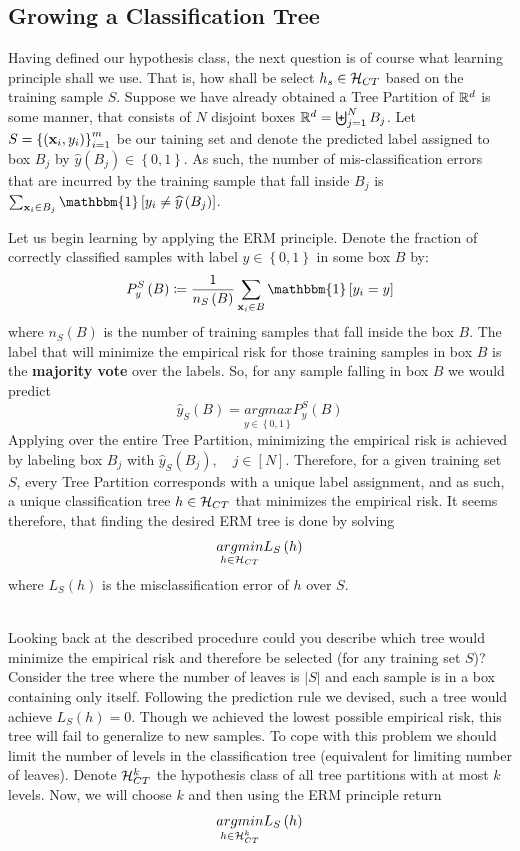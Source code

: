 \subsection{Growing a Classification Tree}
Having defined our hypothesis class, the next question is of course what learning principle shall we use. That is, how shall be select $h_s\in\mathcal{H}_{CT}$ based on the training sample $S$. Suppose we have already obtained a Tree Partition of $\mathbb{R}^d$ is some manner, that consists of $N$ disjoint boxes $\mathbb{R}^d=\biguplus_{j=1}^{N}B_j$. Let $S=\left\{\left(\mathbf{x}_i,y_i\right)\right\}^m_{i=1}$ be our taining set and denote the predicted label assigned to box $B_j$ by $\widehat{y}\left(B_j\right)\in\left\{0,1\right\}$. As such, the number of mis-classification errors that are incurred by the training sample that fall inside $B_j$ is $\sum_{\x_i\in B_j}\mathbbm{1}\left[y_i\neq\widehat{y}\left(B_j\right)\right]$.

Let us begin learning by applying the ERM principle. Denote the fraction of correctly classified samples with label $y\in\left\{0,1\right\}$ in some box $B$ by:
$$ P^S_y\left(B\right)\coloneqq \frac{1}{n_S\left(B\right)}\sum_{\x_i\in B}\mathbbm{1}\left[y_i=y\right]  $$ where $n_S\left(B\right)$ is the number of training samples that fall inside the box $B$. The label that will minimize the empirical risk for those training samples in box $B$ is the \textbf{majority vote} over the labels. So, for any sample falling in box $B$ we would predict $$ \widehat{y}_S\left(B\right)=\underset{y\in\left\{0,1\right\}}{argmax}P^S_y\left(B\right) $$
Applying over the entire Tree Partition, minimizing the empirical risk is achieved by labeling box $B_j$ with $\widehat{y}_S\left(B_j\right),\quad  j\in\left[N\right]$. Therefore, for a given training set $S$, every Tree Partition corresponds with a unique label assignment, and as such, a unique classification tree $h\in\mathcal{H}_{CT}$ that minimizes the empirical risk. It seems therefore, that finding the desired ERM tree is done by solving $$ \underset{h\in\mathcal{H}_{CT}}{argmin}L_S\left(h\right) $$ where $L_S\left(h\right)$ is the misclassification error of $h$ over $S$.

~\\Looking back at the described procedure could you describe which tree would minimize the empirical risk and therefore be selected (for any training set $S$)? Consider the tree where the number of leaves is $\left|S\right|$ and each sample is in a box containing only itself. Following the prediction rule we devised, such a tree would achieve $L_S\left(h\right)=0$. Though we achieved the lowest possible empirical risk, this tree will fail to generalize to new samples. To cope with this problem we should limit the number of levels in the classification tree (equivalent for limiting number of leaves). Denote $\mathcal{H}_{CT}^k$ the hypothesis class of all tree partitions with at most $k$ levels. Now, we will choose $k$ and then using the ERM principle return $$ \underset{h\in\mathcal{H}_{CT}^k}{argmin} L_S\left(h\right)$$

